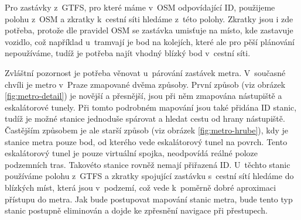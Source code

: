 Pro zastávky z~GTFS, pro které máme v~OSM odpovídající ID, použijeme polohu
z~OSM a zkratky k~cestní síti hledáme z~této polohy. Zkratky jsou i zde potřeba,
protože dle pravidel OSM \cite{OSM} se zastávka umisťuje na místo, kde zastavuje
vozidlo, což například u~tramvají je bod na kolejích, které ale pro pěší
plánování nepoužíváme, tudíž je potřeba najít vhodný blízký bod v~cestní síti.

Zvláštní pozornost je potřeba věnovat u~párování zastávek metra. V~současné
chvíli je metro v~Praze zmapované dvěma způsoby. První způsob (viz obrázek 
\ref{fig:metro-detail}) je novější a
přesnější, jsou při něm zmapována nástupiště a eskalátorové tunely. Při tomto
podrobném mapování jsou také přidána ID stanic, tudíž je možné stanice jednoduše
spárovat a hledat cestu od hrany nástupiště. Častějším způsobem je ale starší
způsob (viz obrázek \ref{fig:metro-hrube}), kdy je stanice metra pouze bod, od
kterého vede eskalátorový tunel na
povrch. Tento eskalátorový tunel je pouze virtuální spojka, neodpovídá reálné
poloze podzemních tras. Takovéto stanice rovněž nemají přiřazená ID. U~těchto
stanic používáme polohu z~GTFS a zkratky spojující zastávku s~cestní sítí
hledáme do blízkých míst, která jsou v~podzemí, což vede k~poměrně dobré
aproximaci přístupu do metra. Jak bude postupovat mapování stanic metra, bude
tento typ stanic postupně eliminován a dojde ke zpřesnění navigace při
přestupech.

